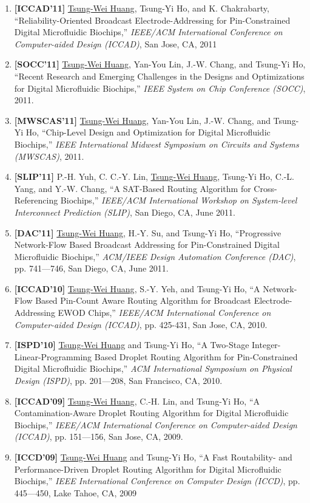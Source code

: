 \documentclass[A4,11pt]{article}
\begin{document}
\begin{enumerate}
    \item \textbf{[ICCAD'11]} \underline{Tsung-Wei Huang}, Tsung-Yi Ho, and K. Chakrabarty, ``Reliability-Oriented Broadcast Electrode-Addressing for Pin-Constrained Digital Microfluidic Biochips,'' \textit{IEEE/ACM International Conference on Computer-aided Design (ICCAD)}, San Jose, CA, 2011

    \item \textbf{[SOCC'11]} \underline{Tsung-Wei Huang}, Yan-You Lin, J.-W. Chang, and Tsung-Yi Ho, ``Recent Research and Emerging Challenges in the Designs and Optimizations for Digital Microfluidic Biochips,'' \textit{IEEE System on Chip Conference (SOCC)}, 2011. 
    \item \textbf{[MWSCAS'11]} \underline{Tsung-Wei Huang}, Yan-You Lin, J.-W. Chang, and Tsung-Yi Ho, ``Chip-Level Design and Optimization for Digital Microfluidic Biochips,'' \textit{IEEE International Midwest Symposium on Circuits and Systems (MWSCAS)}, 2011. 
    
    \item \textbf{[SLIP'11]} P.-H. Yuh, C. C.-Y. Lin, \underline{Tsung-Wei Huang}, Tsung-Yi Ho, C.-L. Yang, and Y.-W. Chang, ``A SAT-Based Routing Algorithm for Cross-Referencing Biochips,'' \textit{IEEE/ACM International Workshop on System-level Interconnect Prediction (SLIP)}, San Diego, CA, June 2011.

    \item \textbf{[DAC'11]} \underline{Tsung-Wei Huang}, H.-Y. Su, and Tsung-Yi Ho, ``Progressive Network-Flow Based Broadcast Addressing for Pin-Constrained Digital Microfluidic Biochips,'' \textit{ACM/IEEE Design Automation Conference (DAC)}, pp. 741—746, San Diego, CA, June 2011. 

    \item \textbf{[ICCAD'10]} \underline{Tsung-Wei Huang}, S.-Y. Yeh, and Tsung-Yi Ho, ``A Network-Flow Based Pin-Count Aware Routing Algorithm for Broadcast Electrode-Addressing EWOD Chips,'' \textit{IEEE/ACM International Conference on Computer-aided Design (ICCAD)}, pp. 425-431, San Jose, CA, 2010. 

    \item \textbf{[ISPD'10]} \underline{Tsung-Wei Huang} and Tsung-Yi Ho, ``A Two-Stage Integer-Linear-Programming Based Droplet Routing Algorithm for Pin-Constrained Digital Microfluidic Biochips,'' \textit{ACM International Symposium on Physical Design (ISPD)}, pp. 201—208, San Francisco, CA, 2010. 

    \item \textbf{[ICCAD'09]} \underline{Tsung-Wei Huang}, C.-H. Lin, and Tsung-Yi Ho, ``A Contamination-Aware Droplet Routing Algorithm for Digital Microfluidic Biochips,'' \textit{IEEE/ACM International Conference on Computer-aided Design (ICCAD)}, pp. 151—156, San Jose, CA, 2009. 

    \item \textbf{[ICCD'09]} \underline{Tsung-Wei Huang} and Tsung-Yi Ho, ``A Fast Routability- and Performance-Driven Droplet Routing Algorithm for Digital Microfluidic Biochips,'' \textit{IEEE International Conference on Computer Design (ICCD)}, pp. 445—450, Lake Tahoe, CA, 2009

 \end{enumerate}
\end{document}
